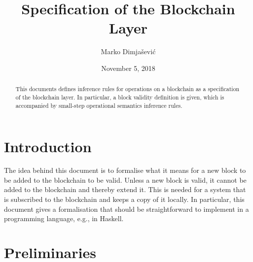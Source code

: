 \documentclass[11pt,a4paper]{article}
\begin{document}
\title{Specification of the Blockchain Layer}

\author{Marko Dimjašević}

\date{November 5, 2018}

\maketitle

\begin{abstract}
  This documents defines inference rules for operations on a blockchain as a
  specification of the blockchain layer.
%
In particular, a block validity definition is given, which is accompanied by
small-step operational semantics inference rules.
\end{abstract}

\tableofcontents
\listoffigures

\section{Introduction}
\label{sec:introduction}

The idea behind this document is to formalise what it means for a new block to
be added to the blockchain to be valid.
%
Unless a new block is valid, it cannot be added to the blockchain and thereby
extend it.
%
This is needed for a system that is subscribed to the blockchain and keeps a
copy of it locally.
%
In particular, this document gives a formalisation that should be
straightforward to implement in a programming language, e.g., in Haskell.


\section{Preliminaries}
\label{sec:preliminaries}
\end{document}
